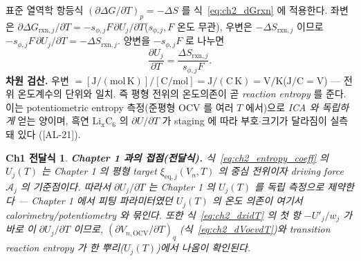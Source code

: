 \documentclass[11pt,a4paper]{article}
\newtheorem*{linkbox}{Ch1 전달식}
\newcommand{\eq}{\mathrm{eq}}
\newcommand{\OCV}{\mathrm{OCV}}
\newcommand{\rxn}{\mathrm{rxn}}
\newcommand{\AL}[1]{\textsf{[AL-#1]}}
\begin{document}
표준 열역학 항등식 $(\partial\Delta G/\partial T)_p=-\Delta S$ 를 식~\eqref{eq:ch2_dGrxn} 에 적용한다. 좌변은
$\partial\Delta G_{\rxn,j}/\partial T=-s_{\phi,j}F\,\partial U_j/\partial T$($s_{\phi,j},F$ 온도 무관), 우변은
$-\Delta S_{\rxn,j}$ 이므로 $-s_{\phi,j}F\,\partial U_j/\partial T=-\Delta S_{\rxn,j}$. 양변을 $-s_{\phi,j}F$
로 나누면
\begin{equation}
\boxed{\;\frac{\partial U_j}{\partial T}=\frac{\Delta S_{\rxn,j}}{s_{\phi,j}F}.\;}
\label{eq:ch2_entropy_coeff}
\end{equation}
\textbf{차원 검산.} 우변 $=[\mathrm{J/(mol\,K)}]/[\mathrm{C/mol}]=\mathrm{J/(C\,K)}=\mathrm{V/K}$($\mathrm{J/C}=\mathrm V$)
— 전위 온도계수의 단위와 일치. 즉 평형 전위의 온도의존이 곧 \emph{reaction entropy} 를 준다. 이는
potentiometric entropy 측정(준평형 OCV 를 여러 $T$ 에서)으로 \emph{ICA 와 독립하게} 얻는 양이며, 흑연
$\mathrm{Li_xC_6}$ 의 $\partial U/\partial T$ 가 staging 에 따라 부호$\cdot$크기가 달라짐이 실측돼 있다
\cite{reynier2004,thomasnewman2003}(\AL{21}).

\begin{linkbox}
\textbf{Chapter 1 과의 접점(전달식).} 식~\eqref{eq:ch2_entropy_coeff} 의 $U_j(T)$ 는 Chapter 1 의 평형
target $\xi_{\eq,j}(V_n,T)$ 의 \emph{중심 전위}이자 driving force $\mathcal A_j$ 의 기준점이다. 따라서
$\partial U_j/\partial T$ 는 Chapter 1 의 $U_j(T)$ 를 \emph{독립 측정으로 제약}한다 — Chapter 1 에서 피팅
파라미터였던 $U_j(T)$ 의 온도 의존이 여기서 calorimetry/potentiometry 와 묶인다. 또한 식~\eqref{eq:ch2_dxidT}
의 첫 항 $-U'_j/w_j$ 가 바로 이 $\partial U_j/\partial T$ 이므로, $(\partial V_{n,\OCV}/\partial T)_q$
(식~\eqref{eq:ch2_dVocvdT})와 transition reaction entropy 가 한 뿌리($U_j(T)$)에서 나옴이 확인된다.
\end{linkbox}
\end{document}
